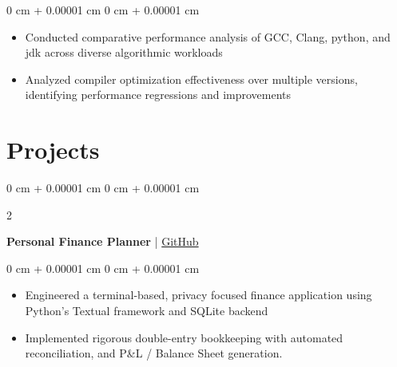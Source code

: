 \documentclass[10 pt,letterpaper]{article}
\newenvironment{highlights}{
    \begin{itemize}[
        topsep=0.10 cm,
        parsep=0.10 cm,
        partopsep=0pt,
        itemsep=0pt,
        leftmargin=0 cm + 10pt
    ]
}{
    \end{itemize}
} %
\newenvironment{onecolentry}{
    \begin{adjustwidth}{
        0 cm + 0.00001 cm
    }{
        0 cm + 0.00001 cm
    }
}{
    \end{adjustwidth}
} %
\newenvironment{twocolentry}[2][]{
    \onecolentry
    \def\secondColumn{#2}
    \setcolumnwidth{\fill, 4.5 cm}
    \begin{paracol}{2}
}{
    \switchcolumn \raggedleft \secondColumn
    \end{paracol}
    \endonecolentry
} %
\begin{document}
        \vspace{0.1 cm}
        \begin{onecolentry}
            \begin{highlights}
              \item Conducted comparative performance analysis of GCC, Clang, python, and jdk across diverse algorithmic workloads
              \item Analyzed compiler optimization effectiveness over multiple versions, identifying performance regressions and improvements
            \end{highlights}
        \end{onecolentry}



        
   


    
    \section{Projects}




        \begin{twocolentry}
            {2025}
            {\textbf{Personal Finance Planner} | \href{https://github.com/Hatimqr/Financial-Planner}{GitHub}}
        \end{twocolentry}
        \vspace{0.10 cm}
        \begin{onecolentry}
            \begin{highlights}
                \item Engineered a terminal-based, privacy focused finance application using Python's Textual framework and SQLite backend
                \item Implemented rigorous double-entry bookkeeping with automated reconciliation, and P\&L / Balance Sheet generation.
            \end{highlights}
        \end{onecolentry}
\end{document}
